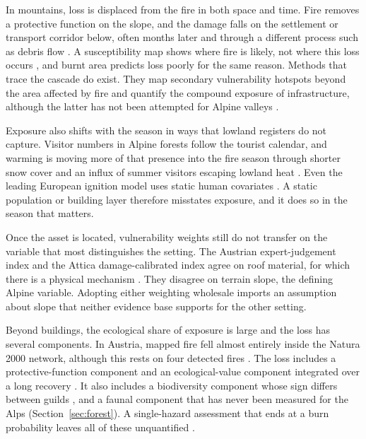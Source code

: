 \documentclass[11pt,a4paper]{article}
\begin{document}
In mountains, loss is displaced from the fire in both space and time. Fire removes a protective function on the slope, and the damage falls on the settlement or transport corridor below, often months later and through a different process such as debris flow \citep{tiranti_wildfires_2021, laporta_postwildfire_2025}. A susceptibility map shows where fire is likely, not where this loss occurs \citep{trucchia_defining_2022}, and burnt area predicts loss poorly for the same reason. Methods that trace the cascade do exist. They map secondary vulnerability hotspots beyond the area affected by fire \citep{riviere_mapping_2023} and quantify the compound exposure of infrastructure, although the latter has not been attempted for Alpine valleys \citep{moftakhari_increasing_2019}.

Exposure also shifts with the season in ways that lowland registers do not capture. Visitor numbers in Alpine forests follow the tourist calendar, and warming is moving more of that presence into the fire season through shorter snow cover and an influx of summer visitors escaping lowland heat \citep{pede_mountain_2022, abrham_wildfires_2024}. Even the leading European ignition model uses static human covariates \citep{gelabert_assessing_2025}. A static population or building layer therefore misstates exposure, and it does so in the season that matters.

Once the asset is located, vulnerability weights still do not transfer on the variable that most distinguishes the setting. The Austrian expert-judgement index and the Attica damage-calibrated index agree on roof material, for which there is a physical mechanism \citep{papathomakohle_towards_2025, papathomakohle_wildfire_2022, naser_vulnerability_2025}. They disagree on terrain slope, the defining Alpine variable. Adopting either weighting wholesale imports an assumption about slope that neither evidence base supports for the other setting.

Beyond buildings, the ecological share of exposure is large and the loss has several components. In Austria, mapped fire fell almost entirely inside the Natura 2000 network, although this rests on four detected fires \citep{jrc_advance_2026}. The loss includes a protective-function component \citep{moos_climate_2021} and an ecological-value component integrated over a long recovery \citep{arrogantefunes_mapping_2024}. It also includes a biodiversity component whose sign differs between guilds \citep{rey_effects_2019, degiuli_arrested_2024}, and a faunal component that has never been measured for the Alps (Section~\ref{sec:forest}). A single-hazard assessment that ends at a burn probability leaves all of these unquantified \citep{trucchia_defining_2022}.
\end{document}
